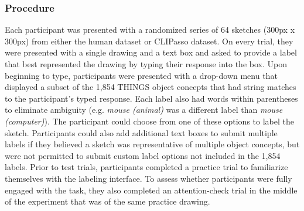 \documentclass[10pt,letterpaper]{article}
\begin{document}
\subsubsection{Procedure}
Each participant was presented with a randomized series of 64 sketches (300px x 300px) from either the human dataset or CLIPasso dataset. 
On every trial, they were presented with a single drawing and a text box and asked to provide a label that best represented the drawing by typing their response into the box. 
Upon beginning to type, participants were presented with a drop-down menu that displayed a subset of the 1,854 THINGS object concepts that had string matches to the participant's typed response.
Each label also had words within parentheses to eliminate ambiguity (e.g. \textit{mouse (animal)} was a different label than \textit{mouse (computer)}). 
The participant could choose from one of these options to label the sketch.
Participants could also add additional text boxes to submit multiple labels if they believed a sketch was representative of multiple object concepts, but were not permitted to submit custom label options not included in the 1,854 labels. 
Prior to test trials, participants completed a practice trial to familiarize themselves with the labeling interface. 
To assess whether participants were fully engaged with the task, they also completed an attention-check trial in the middle of the experiment that was of the same practice drawing. 



\end{document}
